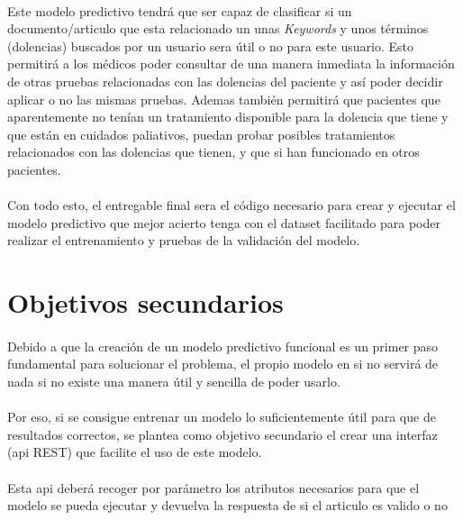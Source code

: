 \documentclass[10pt,a4paper,oneside]{book}
\begin{document}
\paragraph{}
Este modelo predictivo tendrá que ser capaz de clasificar si un documento/articulo que esta relacionado un unas \textit{Keywords} y unos términos (dolencias) buscados por un usuario sera útil o no para este usuario. Esto permitirá a los médicos poder consultar de una manera inmediata la información de otras pruebas relacionadas con las dolencias del paciente y así poder decidir aplicar o no las mismas pruebas. Ademas también permitirá que pacientes que aparentemente no tenían un tratamiento disponible para la dolencia que tiene y que están en cuidados paliativos, puedan probar posibles tratamientos relacionados con las dolencias que tienen, y que si han funcionado en otros pacientes.

\paragraph{}
Con todo esto, el entregable final sera el código necesario para crear y ejecutar el modelo predictivo que mejor acierto tenga con el dataset facilitado para poder realizar el entrenamiento y pruebas de la validación del modelo.

\section{Objetivos secundarios}

\paragraph{}
Debido a que la creación de un modelo predictivo funcional es un primer paso fundamental para solucionar el problema, el propio modelo en si no servirá de nada si no existe una manera útil y sencilla de poder usarlo.

\paragraph{}
Por eso, si se consigue entrenar un modelo lo suficientemente útil para que de resultados correctos, se plantea como objetivo secundario el crear una interfaz (api REST) que facilite el uso de este modelo.

\paragraph{}
Esta api deberá recoger por parámetro los atributos necesarios para que el modelo se pueda ejecutar y devuelva la respuesta de si el articulo es valido o no
\end{document}
